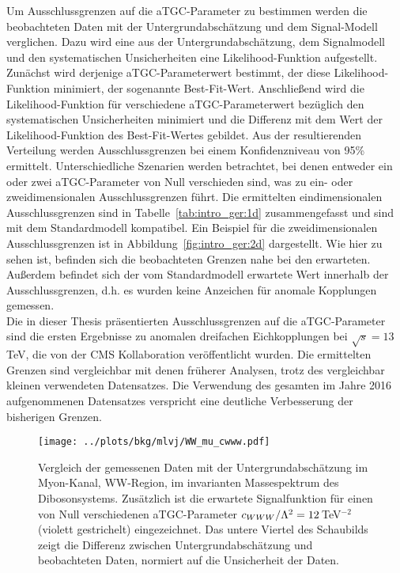 Um Ausschlussgrenzen auf die aTGC-Parameter zu bestimmen werden die beobachteten Daten mit der Untergrundabschätzung und dem Signal-Modell verglichen. Dazu wird eine aus der Untergrundabsch\"atzung, dem Signalmodell und den systematischen Unsicherheiten eine Likelihood-Funktion aufgestellt. Zun\"achst wird derjenige aTGC-Parameterwert bestimmt, der diese Likelihood-Funktion minimiert, der sogenannte Best-Fit-Wert. Anschließend wird die Likelihood-Funktion für verschiedene aTGC-Parameterwert bezüglich den systematischen Unsicherheiten minimiert und die Differenz mit dem Wert der Likelihood-Funktion des Best-Fit-Wertes gebildet. Aus der resultierenden Verteilung werden Ausschlussgrenzen bei einem Konfidenzniveau von 95\% ermittelt. Unterschiedliche Szenarien werden betrachtet, bei denen entweder ein oder zwei aTGC-Parameter von Null verschieden sind, was zu ein- oder zweidimensionalen Ausschlussgrenzen führt. Die ermittelten eindimensionalen Ausschlussgrenzen sind in Tabelle~\ref{tab:intro_ger:1d} zusammengefasst und sind mit dem Standardmodell kompatibel. Ein Beispiel für die zweidimensionalen Ausschlussgrenzen ist in Abbildung~\ref{fig:intro_ger:2d} dargestellt. Wie hier zu sehen ist, befinden sich die beobachteten Grenzen nahe bei den erwarteten. Außerdem befindet sich der vom Standardmodell erwartete Wert innerhalb der Ausschlussgrenzen, d.h. es wurden keine Anzeichen für anomale Kopplungen gemessen.\\

Die in dieser Thesis präsentierten Ausschlussgrenzen auf die aTGC-Parameter sind die ersten Ergebnisse zu anomalen dreifachen Eichkopplungen bei $\sqrt{s}=13$\,TeV, die von der CMS Kollaboration veröffentlicht wurden. Die ermittelten Grenzen sind vergleichbar mit denen früherer Analysen, trotz des vergleichbar kleinen verwendeten Datensatzes. Die Verwendung des gesamten im Jahre 2016 aufgenommenen Datensatzes verspricht eine deutliche Verbesserung der bisherigen Grenzen.


\begin{figure}
    \centering
    \resizebox{0.8\columnwidth}{!}
    {%
    \texttt{[image: ../plots/bkg/mlvj/WW\_mu\_cwww.pdf]}
    \caption[Vergleich der gemessenen Daten mit der Untergrundabschätzung sowie zweidimensionale Ausschlussgrenzen auf \Tccw -\Tcb]{Vergleich der gemessenen Daten mit der Untergrundabschätzung im Myon-Kanal, WW-Region, im invarianten Massespektrum des Dibosonsystems. Zusätzlich ist die erwartete Signalfunktion für einen von Null verschiedenen aTGC-Parameter $c_{WWW}/\Lambda^2=12$\,TeV$^{-2}$ (violett gestrichelt) eingezeichnet. Das untere Viertel des Schaubilds zeigt die Differenz zwischen Untergrundabschätzung und beobachteten Daten, normiert auf die Unsicherheit der Daten.}
    \label{fig:intro_ger:WW}
    }
\end{figure}

